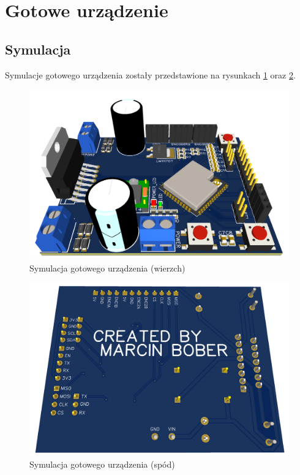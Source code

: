 \section{Gotowe urządzenie}

    \subsection{Symulacja}
    Symulacje gotowego urządzenia zostały przedstawione na rysunkach \ref{fig:prototype_sym_1} oraz \ref{fig:prototype_sym_2}.
    
    \begin{figure}[ht]
        \centering
        \includegraphics[height=0.32\textheight]{img/prototype_sym_1.png}
        \caption{Symulacja  gotowego urządzenia (wierzch)}
        \label{fig:prototype_sym_1}
    \end{figure}
    
    \begin{figure}[ht]
        \centering
        \includegraphics[height=0.32\textheight]{img/prototype_sym_2.png}
        \caption{Symulacja gotowego urządzenia (spód)}
        \label{fig:prototype_sym_2}
    \end{figure}

